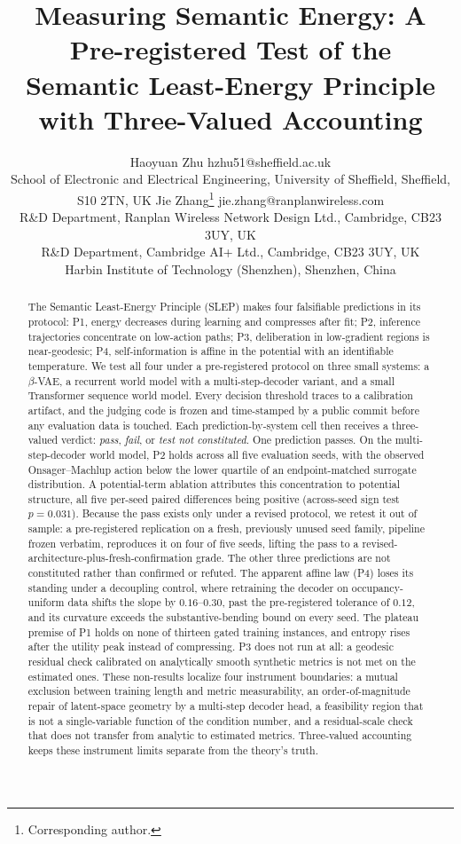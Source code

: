 \documentclass{article}
\title{Measuring Semantic Energy: A Pre-registered Test of the\\
       Semantic Least-Energy Principle with Three-Valued Accounting}
\author{%
  \name Haoyuan Zhu \email hzhu51@sheffield.ac.uk \\
  \addr School of Electronic and Electrical Engineering, University of Sheffield,
        Sheffield, S10 2TN, UK
  \AND
  \name Jie Zhang\thanks{Corresponding author.} \email jie.zhang@ranplanwireless.com \\
  \addr R\&D Department, Ranplan Wireless Network Design Ltd., Cambridge, CB23 3UY, UK \\
  \addr R\&D Department, Cambridge AI+ Ltd., Cambridge, CB23 3UY, UK \\
  \addr Harbin Institute of Technology (Shenzhen), Shenzhen, China
}
\begin{document}
\maketitle

\begin{abstract}
The Semantic Least-Energy Principle (SLEP) makes four falsifiable predictions in
its protocol: P1, energy decreases during learning and compresses after fit; P2,
inference trajectories concentrate on low-action paths; P3, deliberation in
low-gradient regions is near-geodesic; P4, self-information is affine in the
potential with an identifiable temperature. We test all four under a
pre-registered protocol on three small systems: a $\beta$-VAE, a recurrent world
model with a multi-step-decoder variant, and a small Transformer sequence world
model. Every decision threshold traces to a calibration artifact, and the judging
code is frozen and time-stamped by a public commit before any evaluation data is
touched. Each prediction-by-system cell then receives a three-valued verdict:
\emph{pass}, \emph{fail}, or \emph{test not constituted}. One prediction passes.
On the multi-step-decoder world model, P2 holds across all five evaluation seeds,
with the observed Onsager--Machlup action below the lower quartile of an
endpoint-matched surrogate distribution. A potential-term ablation attributes this
concentration to potential structure, all five per-seed paired differences being
positive (across-seed sign test $p=0.031$). Because the pass exists only under a
revised protocol, we retest it out of sample: a pre-registered replication on a
fresh, previously unused seed family, pipeline frozen verbatim, reproduces it on
four of five seeds, lifting the pass to a revised-architecture-plus-fresh-confirmation
grade. The other three predictions are not constituted rather than confirmed or
refuted. The apparent affine law (P4) loses its standing under a decoupling
control, where retraining the decoder on occupancy-uniform data shifts the slope
by $0.16$--$0.30$, past the pre-registered tolerance of $0.12$, and its curvature
exceeds the substantive-bending bound on every seed. The plateau premise of P1
holds on none of thirteen gated training instances, and entropy rises after the
utility peak instead of compressing. P3 does not run at all: a geodesic residual
check calibrated on analytically smooth synthetic metrics is not met on the
estimated ones. These non-results localize four instrument boundaries: a mutual
exclusion between training length and metric measurability, an order-of-magnitude
repair of latent-space geometry by a multi-step decoder head, a feasibility region
that is not a single-variable function of the condition number, and a
residual-scale check that does not transfer from analytic to estimated metrics.
Three-valued accounting keeps these instrument limits separate from the theory's
truth.
\end{abstract}
\end{document}

